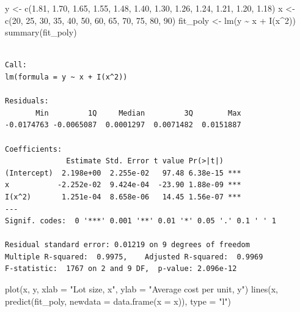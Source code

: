 \documentclass[
  letterpaper,
]{scrbook}
\newenvironment{Shaded}{\begin{snugshade}}{\end{snugshade}}
\newcommand{\AttributeTok}[1]{\textcolor[rgb]{0.40,0.45,0.13}{#1}}
\newcommand{\DecValTok}[1]{\textcolor[rgb]{0.68,0.00,0.00}{#1}}
\newcommand{\FloatTok}[1]{\textcolor[rgb]{0.68,0.00,0.00}{#1}}
\newcommand{\FunctionTok}[1]{\textcolor[rgb]{0.28,0.35,0.67}{#1}}
\newcommand{\NormalTok}[1]{\textcolor[rgb]{0.00,0.23,0.31}{#1}}
\newcommand{\OtherTok}[1]{\textcolor[rgb]{0.00,0.23,0.31}{#1}}
\newcommand{\SpecialCharTok}[1]{\textcolor[rgb]{0.37,0.37,0.37}{#1}}
\newcommand{\StringTok}[1]{\textcolor[rgb]{0.13,0.47,0.30}{#1}}
\begin{document}
\begin{Shaded}
\begin{Highlighting}[]
\NormalTok{y }\OtherTok{\textless{}{-}} \FunctionTok{c}\NormalTok{(}\FloatTok{1.81}\NormalTok{, }\FloatTok{1.70}\NormalTok{, }\FloatTok{1.65}\NormalTok{, }\FloatTok{1.55}\NormalTok{, }\FloatTok{1.48}\NormalTok{, }\FloatTok{1.40}\NormalTok{, }\FloatTok{1.30}\NormalTok{, }\FloatTok{1.26}\NormalTok{, }\FloatTok{1.24}\NormalTok{, }\FloatTok{1.21}\NormalTok{, }\FloatTok{1.20}\NormalTok{, }\FloatTok{1.18}\NormalTok{)}
\NormalTok{x }\OtherTok{\textless{}{-}} \FunctionTok{c}\NormalTok{(}\DecValTok{20}\NormalTok{, }\DecValTok{25}\NormalTok{, }\DecValTok{30}\NormalTok{, }\DecValTok{35}\NormalTok{, }\DecValTok{40}\NormalTok{, }\DecValTok{50}\NormalTok{, }\DecValTok{60}\NormalTok{, }\DecValTok{65}\NormalTok{, }\DecValTok{70}\NormalTok{, }\DecValTok{75}\NormalTok{, }\DecValTok{80}\NormalTok{, }\DecValTok{90}\NormalTok{)}
\NormalTok{fit\_poly }\OtherTok{\textless{}{-}} \FunctionTok{lm}\NormalTok{(y }\SpecialCharTok{\textasciitilde{}}\NormalTok{ x }\SpecialCharTok{+} \FunctionTok{I}\NormalTok{(x}\SpecialCharTok{\^{}}\DecValTok{2}\NormalTok{))}
\FunctionTok{summary}\NormalTok{(fit\_poly)}
\end{Highlighting}
\end{Shaded}

\begin{verbatim}

Call:
lm(formula = y ~ x + I(x^2))

Residuals:
       Min         1Q     Median         3Q        Max 
-0.0174763 -0.0065087  0.0001297  0.0071482  0.0151887 

Coefficients:
              Estimate Std. Error t value Pr(>|t|)    
(Intercept)  2.198e+00  2.255e-02   97.48 6.38e-15 ***
x           -2.252e-02  9.424e-04  -23.90 1.88e-09 ***
I(x^2)       1.251e-04  8.658e-06   14.45 1.56e-07 ***
---
Signif. codes:  0 '***' 0.001 '**' 0.01 '*' 0.05 '.' 0.1 ' ' 1

Residual standard error: 0.01219 on 9 degrees of freedom
Multiple R-squared:  0.9975,    Adjusted R-squared:  0.9969 
F-statistic:  1767 on 2 and 9 DF,  p-value: 2.096e-12
\end{verbatim}

\begin{Shaded}
\begin{Highlighting}[]
\FunctionTok{plot}\NormalTok{(x, y, }\AttributeTok{xlab =} \StringTok{"Lot size, x"}\NormalTok{, }\AttributeTok{ylab =} \StringTok{"Average cost per unit, y"}\NormalTok{)}
\FunctionTok{lines}\NormalTok{(x, }\FunctionTok{predict}\NormalTok{(fit\_poly, }\AttributeTok{newdata =} \FunctionTok{data.frame}\NormalTok{(}\AttributeTok{x =}\NormalTok{ x)), }\AttributeTok{type =} \StringTok{"l"}\NormalTok{)}
\end{Highlighting}
\end{Shaded}
\end{document}
